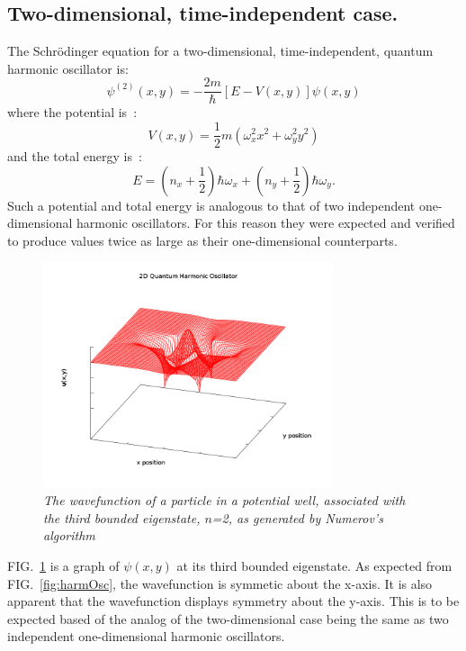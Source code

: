 \documentclass[aps,prl,twocolumn,superscriptaddress]{revtex4-1}
\begin{document}
\subsection{Two-dimensional, time-independent case.}

The Schr\"{o}dinger equation for a two-dimensional, time-independent, quantum harmonic oscillator is:
\begin{equation}
\psi^{(2)}(x,y) = -\frac{2m}{\hbar}[E-V(x,y)]\psi(x,y) \label{2DHO}
\end{equation}
where the potential is~\cite{mathjournal}:
$$V(x,y) = \frac{1}{2}m(\omega_{x}^2 x^2 + \omega_{y}^2 y^2)$$
and the total energy is~\cite{mathjournal}:
$$E = (n_{x} + \frac{1}{2})\hbar \omega_{x} + (n_{y} + \frac{1}{2})\hbar \omega_{y}.$$
Such a potential and total energy is analogous to that of two independent one-dimensional harmonic 
oscillators.  For this reason they were expected and verified to produce values twice as large as their 
one-dimensional counterparts.


\begin{figure}[H]
  \begin{center}
\centerline{\includegraphics[width=3.35in]{2D_psi.png}}
\caption{\it \small{The wavefunction of a particle in a potential well, associated with the third bounded eigenstate, $n$=2, as generated by Numerov's algorithm \label{2Dpsi_n2}}}
  \end{center}
\end{figure}

FIG.~\ref{2Dpsi_n2} is a graph of $\psi(x,y)$ at its third bounded eigenstate.  As expected from FIG.~\ref{fig:harmOsc}, 
the wavefunction is symmetic about the x-axis.  It is also apparent that the wavefunction displays symmetry about the y-axis.  
This is to be expected based of the analog of the two-dimensional case being the same as two independent one-dimensional 
harmonic oscillators.
\end{document}
